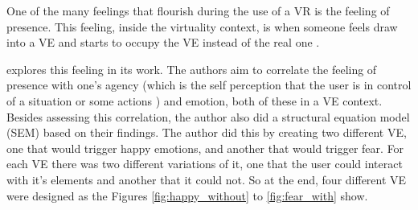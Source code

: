 One of the many feelings that flourish during the use of a VR is the feeling of presence. This feeling, inside the virtuality context, is when someone feels draw into a VE and starts to occupy the VE instead of the real one \cite{cummings2016immersive}.

 explores this feeling in its work. The authors aim to correlate the feeling of presence with one's agency (which is the self perception that the user is in control of a situation or some actions \cite{farrer2002experiencing}) and emotion, both of these in a VE context. Besides assessing this correlation, the author also did a structural equation model (SEM) based on their findings. The author did this by creating two different VE, one that would trigger happy emotions, and another that would trigger fear. For each VE there was two different variations of it, one that the user could interact with it's elements and another that it could not. So at the end, four different VE were designed as the Figures \ref{fig:happy_without} to \ref{fig:fear_with} show.

